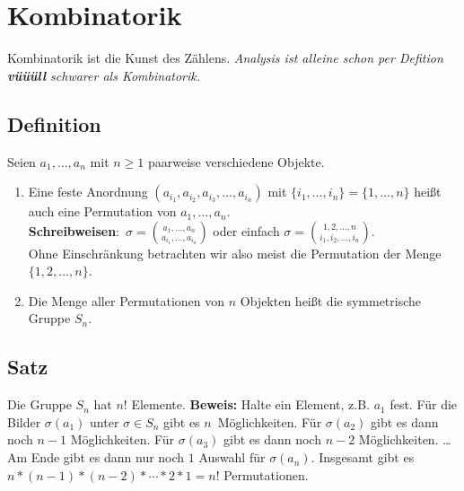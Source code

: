 \section{Kombinatorik}
Kombinatorik ist die Kunst des Zählens. {\small \textit{Analysis ist alleine schon per Defition \textbf{vüüüll} schwarer als Kombinatorik.}}

\subsection{Definition}
Seien $a_1,\ldots,a_n$ mit $n\geq1$ paarweise verschiedene Objekte.
\begin{enumerate}
\item Eine feste Anordnung $(a_{i_1},a_{i_2},a_{i_3},\ldots,a_{i_n})$ mit $\{i_1,\ldots,i_n\} = \{1,\ldots,n\}$ heißt auch eine Permutation von $a_1,\ldots,a_n$. \\
\textbf{Schreibweisen}: $\sigma = \binom{a_1,\ldots,a_n}{a_{i_1},\ldots,a_{i_n}}$ oder einfach $\sigma = \binom{1,2,\ldots,n}{i_1,i_2,\ldots,i_n}$.\\
Ohne Einschränkung betrachten wir also meist die Permutation der Menge $\{1,2,\ldots,n\}$.
\item Die Menge aller Permutationen von $n$ Objekten heißt die  symmetrische Gruppe $S_n$.
\end{enumerate}

\subsection{Satz}
Die Gruppe $S_n$ hat $n!$ Elemente.
\textbf{Beweis:} Halte ein Element, z.B. $a_1$ fest. Für die Bilder $\sigma(a_1)$ unter $\sigma\in S_n$ gibt es $n$ Möglichkeiten.
Für $\sigma(a_2)$ gibt es dann noch $n-1$ Möglichkeiten.
Für $\sigma(a_3)$ gibt es dann noch $n-2$ Möglichkeiten. \dots
Am Ende gibt es dann nur noch $1$ Auswahl für $\sigma(a_n)$.
Insgesamt gibt es $n * (n-1) * (n-2) * \cdots * 2 * 1 = n!$ Permutationen.

